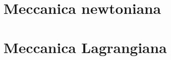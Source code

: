 \documentclass[12pt]{book}
\begin{document}
	
	
	\newpage
	\pagestyle{dispensa}
	
	\chapter{Meccanica newtoniana}
	\renewcommand{\tem}{\ensuremath{\mathcal{N}}}
	
	
	\newpage
	
	
	\newpage
	
	
	\newpage
	
	
	\newpage
	
	
	\newpage
	\chapter{Meccanica Lagrangiana}
	
	
	\newpage
	
	
	\newpage
	

     \newpage
     
	
\end{document}
